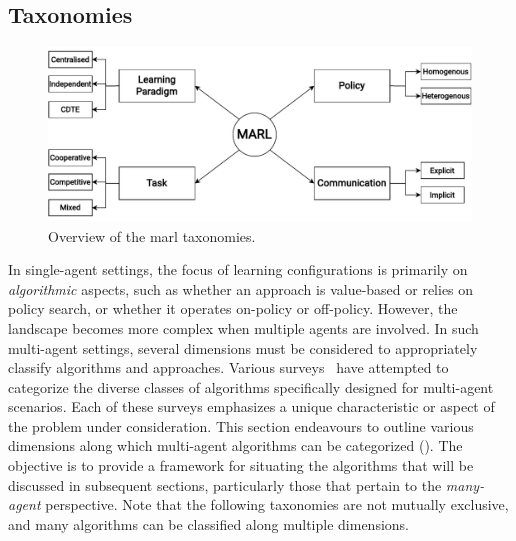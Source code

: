 \subsection{Taxonomies}
\begin{figure}
  \includegraphics[width=\textwidth]{chapters/img/marl-taxonomy.drawio.pdf}
  \caption{Overview of the \ac{marl} taxonomies.}\label{fig:marl:taxonomy}
\end{figure}
In single-agent settings, the focus of learning configurations is primarily on \emph{algorithmic} aspects, 
 such as whether an approach is value-based or relies on policy search, 
 or whether it operates on-policy or off-policy. 
%
However, the landscape becomes more complex when multiple agents are involved. 
In such multi-agent settings, 
 several dimensions must be considered to appropriately classify algorithms and approaches. 
Various surveys~\cite{DBLP:journals/corr/abs-2108-02731,DBLP:journals/corr/abs-1908-03963} have attempted to categorize the diverse classes of algorithms specifically designed for multi-agent scenarios. 
Each of these surveys emphasizes a unique characteristic or aspect of the problem under consideration. 
%
This section endeavours to outline various dimensions along which multi-agent algorithms can be categorized (). 
 The objective is to provide a framework for situating the algorithms that will be discussed in subsequent sections, 
 particularly those that pertain to the \emph{many-agent} perspective.
Note that the following taxonomies are not mutually exclusive, 
 and many algorithms can be classified along multiple dimensions.
